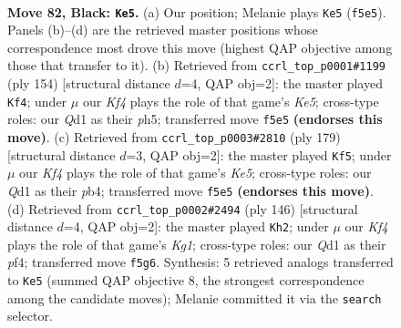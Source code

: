 \documentclass[11pt]{article}
\begin{document}
\clearpage

\begin{figure}[p]\centering
\begin{subfigure}{0.46\textwidth}\centering
\resizebox{\linewidth}{!}{%
\newchessgame
\chessboard[
  setfen={8/8/1p6/p4k2/2P5/8/1K6/3q4 b - - 21 82},
  showmover=false,
  pgfstyle=straightmove, color=movearrow, markmove={f5-e5}
]}
\caption{}
\end{subfigure}\hfill
\begin{subfigure}{0.46\textwidth}\centering
\resizebox{\linewidth}{!}{%
\newchessgame
\chessboard[
  setfen={5k2/8/8/p3K2p/2P5/1P6/8/8 w - - 3 78},
  showmover=false,
  pgfstyle=straightmove, color=movearrow, markmove={e5-f4}
]}
\caption{}
\end{subfigure}
\\[4pt]
\begin{subfigure}{0.46\textwidth}\centering
\resizebox{\linewidth}{!}{%
\newchessgame
\chessboard[
  setfen={8/6p1/6Pp/8/1P2k3/8/6K1/8 b - - 12 90},
  showmover=false,
  pgfstyle=straightmove, color=movearrow, markmove={e4-f5}
]}
\caption{}
\end{subfigure}\hfill
\begin{subfigure}{0.46\textwidth}\centering
\resizebox{\linewidth}{!}{%
\newchessgame
\chessboard[
  setfen={8/8/8/3k2Pp/5p1P/8/8/6K1 w - - 12 74},
  showmover=false,
  pgfstyle=straightmove, color=movearrow, markmove={g1-h2}
]}
\caption{}
\end{subfigure}
\caption{\textbf{Move 82, Black: \texttt{Ke5}.} (a) Our position; Melanie plays \texttt{Ke5} (\texttt{f5e5}). Panels (b)--(d) are the retrieved master positions whose correspondence most drove this move (highest QAP objective among those that transfer to it). (b) Retrieved from \texttt{ccrl\_top\_p0001\#1199} (ply 154) [structural distance $d$=4, QAP obj=2]: the master played \texttt{Kf4}; under $\mu$ our \emph{Kf4} plays the role of that game's \emph{Ke5}; cross-type roles: our \emph{Q}d1 as their \emph{p}h5; transferred move \texttt{f5e5} \textbf{(endorses this move)}. (c) Retrieved from \texttt{ccrl\_top\_p0003\#2810} (ply 179) [structural distance $d$=3, QAP obj=2]: the master played \texttt{Kf5}; under $\mu$ our \emph{Kf4} plays the role of that game's \emph{Ke5}; cross-type roles: our \emph{Q}d1 as their \emph{p}b4; transferred move \texttt{f5e5} \textbf{(endorses this move)}. (d) Retrieved from \texttt{ccrl\_top\_p0002\#2494} (ply 146) [structural distance $d$=4, QAP obj=2]: the master played \texttt{Kh2}; under $\mu$ our \emph{Kf4} plays the role of that game's \emph{Kg1}; cross-type roles: our \emph{Q}d1 as their \emph{p}f4; transferred move \texttt{f5g6}. Synthesis: 5 retrieved analogs transferred to \texttt{Ke5} (summed QAP objective 8, the strongest correspondence among the candidate moves); Melanie committed it via the \texttt{search} selector.}
\label{fig:thought-m163}
\end{figure}
\end{document}
